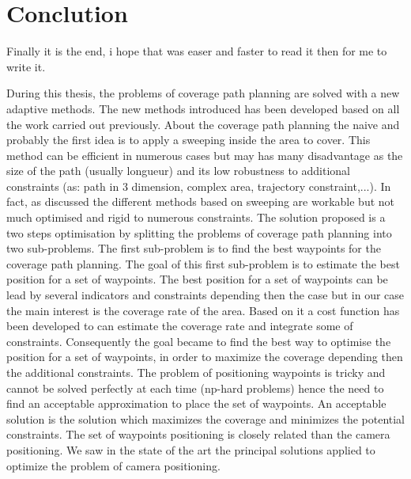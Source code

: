 \chapter{Conclution}\label{chap:Conclu}

\minitoc


Finally it is the end, i hope that was easer and faster to read it then for me to write it.

During this thesis, the problems of coverage path planning are solved with a new adaptive methods. The new methods introduced has been developed based on all the work carried out previously. 
About the coverage path planning the naive and probably the first idea is to apply a sweeping inside the area to cover. This method can be efficient in numerous cases but may has many disadvantage as the size of the path (usually longueur) and its low robustness to additional constraints (as: path in 3 dimension, complex area, trajectory constraint,...). In fact, as discussed the different methods based on sweeping are workable but not much optimised and rigid to numerous constraints. 
The solution proposed is a two steps optimisation by splitting the problems of coverage path planning into two sub-problems. The first sub-problem is to find the best waypoints for the coverage path planning. 
The goal of this first sub-problem is to estimate the best position for a set of waypoints. 
The best position  for a set of waypoints can be lead by several indicators and constraints depending then the case but in our case the main interest is the coverage rate of the area. Based on it a cost function has been developed to can estimate the coverage rate and integrate some of constraints.
Consequently the goal became to find the best way to optimise the position for a set of waypoints, in order to maximize the coverage depending then the additional constraints. The problem of positioning waypoints is tricky and cannot be solved perfectly at each time (np-hard problems) hence the need to find an acceptable approximation to place the set of waypoints. An acceptable solution is the solution which maximizes the coverage and minimizes the potential constraints.
The set of waypoints positioning is closely related than the camera positioning. We saw in the state of the art the principal solutions applied to optimize the problem of camera positioning.
